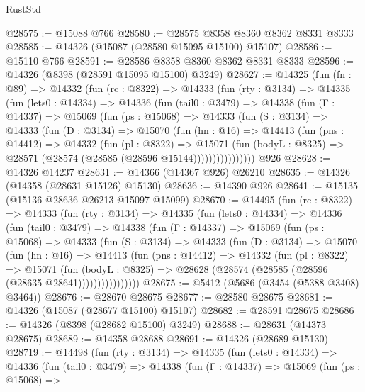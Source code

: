 \begin{lexlean}{RustStd}
\begin{coremodule}
@28575 := @15088 @766
@28580 := @28575 @8358 @8360 @8362 @8331 @8333
@28585 := @14326 (@15087 (@28580 @15095 @15100) @15107)
@28586 := @15110 @766
@28591 := @28586 @8358 @8360 @8362 @8331 @8333
@28596 := @14326 (@8398 (@28591 @15095 @15100) @3249)
@28627 := @14325
    (fun (fn : @89) =>
    @14332
      (fun (rc : @8322) =>
      @14333
        (fun (rty : @3134) =>
        @14335
          (fun (lets0 : @14334) =>
          @14336
            (fun (tail0 : @3479) =>
            @14338
              (fun (Γ : @14337) =>
              @15069
                (fun (ps : @15068) =>
                @14333
                  (fun (S : @3134) =>
                  @14333
                    (fun (D : @3134) =>
                    @15070
                      (fun (hn : @16) =>
                      @14413
                        (fun (pns : @14412) =>
                        @14332
                          (fun (pl : @8322) =>
                          @15071
                            (fun (bodyL : @8325) =>
                            @28571 (@28574 (@28585 (@28596 @15144))))))))))))))))
    @926
@28628 := @14326 @14237
@28631 := @14366 (@14367 @926) @26210
@28635 := @14326 (@14358 (@28631 @15126) @15130)
@28636 := @14390 @926
@28641 := @15135 (@15136 @28636 @26213 @15097 @15099)
@28670 := @14495
    (fun (rc : @8322) =>
    @14333
      (fun (rty : @3134) =>
      @14335
        (fun (lets0 : @14334) =>
        @14336
          (fun (tail0 : @3479) =>
          @14338
            (fun (Γ : @14337) =>
            @15069
              (fun (ps : @15068) =>
              @14333
                (fun (S : @3134) =>
                @14333
                  (fun (D : @3134) =>
                  @15070
                    (fun (hn : @16) =>
                    @14413
                      (fun (pns : @14412) =>
                      @14332
                        (fun (pl : @8322) =>
                        @15071
                          (fun (bodyL : @8325) =>
                          @28628 (@28574 (@28585 (@28596 (@28635 @28641))))))))))))))))
@28675 := @5412 (@5686 (@3454 (@5388 @3408) @3464))
@28676 := @28670 @28675
@28677 := @28580 @28675
@28681 := @14326 (@15087 (@28677 @15100) @15107)
@28682 := @28591 @28675
@28686 := @14326 (@8398 (@28682 @15100) @3249)
@28688 := @28631 (@14373 @28675)
@28689 := @14358 @28688
@28691 := @14326 (@28689 @15130)
@28719 := @14498
    (fun (rty : @3134) =>
    @14335
      (fun (lets0 : @14334) =>
      @14336
        (fun (tail0 : @3479) =>
        @14338
          (fun (Γ : @14337) =>
          @15069
            (fun (ps : @15068) =>

\end{coremodule}
\end{lexlean}
